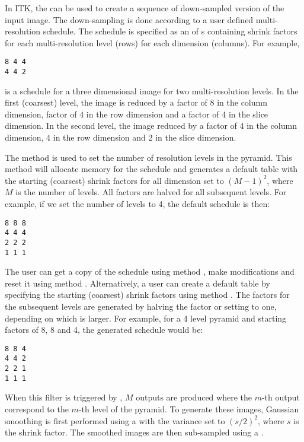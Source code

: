 

In ITK, the  can be used to create a
sequence of down-sampled version of the input image.  The down-sampling is done
according to a user defined multi-resolution schedule. The schedule is
specified as an  of s containing shrink factors for
each multi-resolution level (rows) for each dimension (columns). For example,

\small
\begin{verbatim}
8 4 4
4 4 2
\end{verbatim}
\normalsize

is a schedule for a three dimensional image for two multi-resolution levels. 
In the first (coarsest) level, the image is reduced by a factor of 8 
in the column dimension, factor of 4 in the row dimension and a factor
of 4 in the slice dimension. In the second level, the image reduced
by a factor of 4 in the column dimension, 4 in the row dimension and
2 in the slice dimension.


The method  is used to set the number of
resolution levels in the pyramid. This method will allocate memory
for the schedule and generates a default table with the starting
(coarsest) shrink factors for all dimension set to $(M-1)^2$, 
where $M$ is the number of levels. All factors are halved for
all subsequent levels. For example, if we set the number of levels
to 4, the default schedule is then:

\small
\begin{verbatim}
8 8 8
4 4 4
2 2 2
1 1 1
\end{verbatim}
\normalsize


The user can get a copy of the schedule using method ,
make modifications and reset it using method .
Alternatively, a user can create a default table by specifying the
starting (coarsest) shrink factors using method 
. The factors for the subsequent
levels are generated by halving the factor or setting to one, 
depending on which is larger. For example, for a 4 level pyramid
and starting factors of 8, 8 and 4, the generated schedule would be:

\small
\begin{verbatim}
8 8 4
4 4 2
2 2 1
1 1 1
\end{verbatim}
\normalsize

When this filter is triggered by , $M$ outputs are produced
where the $m$-th output correspond to the $m$-th level of the pyramid.
To generate these images, Gaussian smoothing is first performed using a
 with the variance set to $(s/2)^2$,
where $s$ is the shrink factor. The smoothed images are then sub-sampled using
a .
